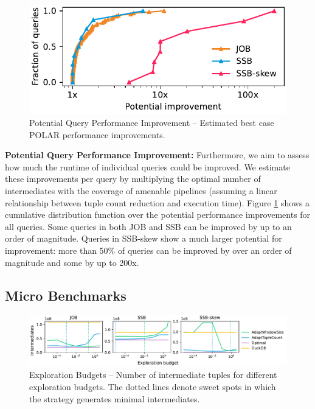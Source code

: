 \begin{figure}[!t]
    \centering
		\vspace{-0.1cm}
    \includegraphics[width=\linewidth]{figures/1_3_potential_query_improvements.pdf}
    \vspace{-0.75cm}
		\caption{Potential Query Performance Improvement -- Estimated best case POLAR performance improvements.}
    \label{fig:1_3_potential_query_improvements}
		\vspace{-0.25cm}
\end{figure}

\textbf{Potential Query Performance Improvement:} Furthermore, we aim to assess how much the runtime of individual queries could be improved. We estimate these improvements per query by multiplying the optimal number of intermediates with the coverage of amenable pipelines (assuming a linear relationship between tuple count reduction and execution time). Figure \ref{fig:1_3_potential_query_improvements} shows a cumulative distribution function over the potential performance improvements for all queries. Some queries in both JOB and SSB can be improved by up to an order of magnitude. Queries in SSB-skew show a much larger potential for improvement: more than 50\% of queries can be improved by over an order of magnitude and some by up to 200x. 

\subsection{Micro Benchmarks}

\begin{figure}[!t]
    \centering
    \includegraphics[width=\textwidth]{figures/2_3_routing_adaptive.pdf}
		\vspace{-0.75cm}
    \caption{Exploration Budgets -- Number of intermediate tuples for different exploration budgets. The dotted lines denote sweet spots in which the strategy generates minimal intermediates.}
    \label{fig:2_3_routing_adaptive}
\end{figure}

